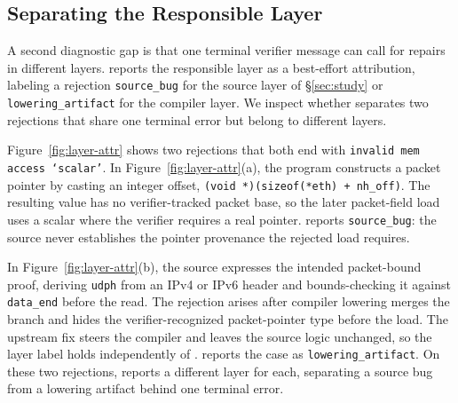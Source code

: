 

\subsection{Separating the Responsible Layer}
\label{sec:eval-layer-attribution}

A second diagnostic gap is that one terminal verifier message can call for repairs in different layers.
\sys reports the responsible layer as a best-effort attribution, labeling a rejection \texttt{source\_bug} for the source layer of \S\ref{sec:study} or \texttt{lowering\_artifact} for the compiler layer. We inspect whether \sys separates two rejections that share one terminal error but belong to different layers.

Figure~\ref{fig:layer-attr} shows two rejections that both end with \texttt{invalid mem access `scalar'}.
In Figure~\ref{fig:layer-attr}(a), the program constructs a packet pointer by casting an integer offset, \texttt{(void *)(sizeof(*eth) + nh\_off)}.
The resulting value has no verifier-tracked packet base, so the later packet-field load uses a scalar where the verifier requires a real pointer.
\sys reports \texttt{source\_bug}: the source never establishes the pointer provenance the rejected load requires.

In Figure~\ref{fig:layer-attr}(b), the source expresses the intended packet-bound proof, deriving \texttt{udph} from an IPv4 or IPv6 header and bounds-checking it against \texttt{data\_end} before the read.
The rejection arises after compiler lowering merges the branch and hides the verifier-recognized packet-pointer type before the load.
The upstream fix steers the compiler and leaves the source logic unchanged, so the layer label holds independently of \sys.
\sys reports the case as \texttt{lowering\_artifact}.
On these two rejections, \sys reports a different layer for each, separating a source bug from a lowering artifact behind one terminal error.

